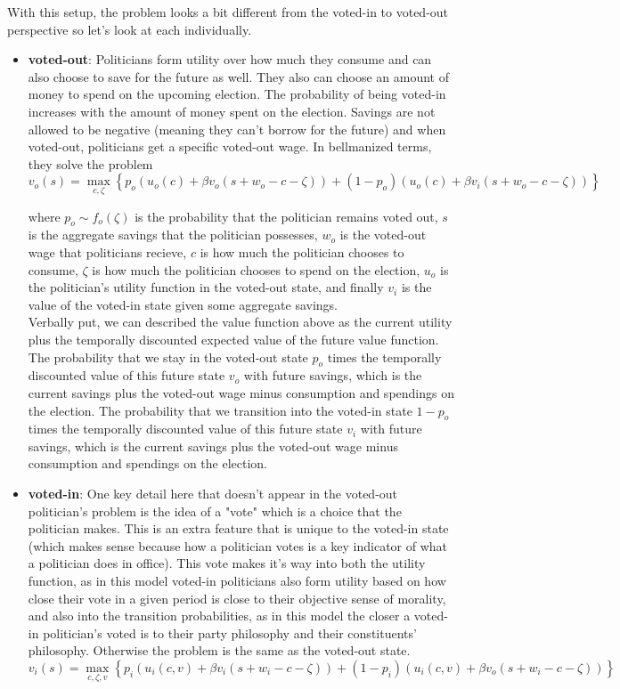 \documentclass[11pt,english]{article}
\begin{document}
\noindent With this setup, the problem looks a bit different from the voted-in to voted-out perspective so let's look at each individually.
\begin{itemize}
\item \textbf{voted-out}: Politicians form utility over how much they consume and can also choose to save for the future as well. They also can choose an amount of money to spend on the upcoming election. The probability of being voted-in increases with the amount of money spent on the election. Savings are not allowed to be negative (meaning they can't borrow for the future) and when voted-out, politicians get a specific voted-out wage. In bellmanized terms, they solve the problem
$$v_{o}(s) = \max_{c, \zeta}\left\{p_o(u_o(c) + \beta v_o(s + w_o - c - \zeta)) + (1-p_o)(u_o(c) + \beta v_i(s + w_o - c - \zeta))\right\}$$

where $p_o \sim f_o(\zeta)$ is the probability that the politician remains voted out, $s$ is the aggregate savings that the politician possesses, $w_o$ is the voted-out wage that politicians recieve, $c$ is how much the politician chooses to consume, $\zeta$ is how much the politician chooses to spend on the election, $u_o$ is the politician's utility function in the voted-out state, and finally $v_i$ is the value of the voted-in state given some aggregate savings.\\

\noindent Verbally put, we can described the value function above as the current utility plus the temporally discounted expected value of the future value function. The probability that we stay in the voted-out state $p_o$ times the temporally discounted value of this future state $v_o$ with future savings, which is the current savings plus the voted-out wage minus consumption and spendings on the election. The probability that we transition into the voted-in state $1-p_o$ times the temporally discounted value of this future state $v_i$ with future savings, which is the current savings plus the voted-out wage minus consumption and spendings on the election.

\item \textbf{voted-in}: One key detail here that doesn't appear in the voted-out politician's problem is the idea of a "vote" which is a choice that the politician makes. This is an extra feature that is unique to the voted-in state (which makes sense because how a politician votes is a key indicator of what a politician does in office). This vote makes it's way into both the utility function, as in this model voted-in politicians also form utility based on how close their vote in a given period is close to their objective sense of morality, and also into the transition probabilities, as in this model the closer a voted-in politician's voted is to their party philosophy and their constituents' philosophy. Otherwise the problem is the same as the voted-out state.
$$v_{i}(s) = \max_{c, \zeta, v}\left\{p_i(u_i(c, v) + \beta v_i(s + w_i - c - \zeta)) + (1-p_i)(u_i(c, v) + \beta v_o(s + w_i - c - \zeta))\right\}$$


\end{itemize}
\end{document}
